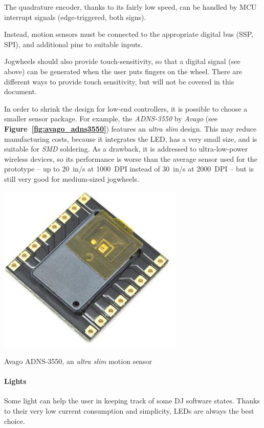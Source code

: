 \documentclass[a4paper,10pt]{article}
\makeatletter
\newenvironment{figurehere}{\def\@captype{figure}\vspace{2ex}}{\vspace{2ex}}
\newcommand{\citef}[1]{\textbf{Figure~\ref{#1}}}
\makeatother
\begin{document}
\begin{multicols}{2}
The quadrature encoder, thanks to its fairly low speed, can be handled by
MCU interrupt signals (edge-triggered, both signs).

Instead, motion sensors must be connected to the appropriate digital bus
(SSP, SPI), and additional pins to suitable inputs.

Jogwheels should also provide touch-sensitivity, so that a digital signal
(see above) can be generated when the user puts fingers on the wheel.
There are different ways to provide touch sensitivity, but will not be
covered in this document.

In order to shrink the design for low-end controllers, it is possible to
choose a smaller sensor package. For example, the \emph{ADNS-3550} by
\emph{Avago} \cite{avago_adns3550} (see \citef{fig:avago_adns3550}) features
an \emph{ultra slim} design. This may reduce manufacturing costs, because it
integrates the LED, has a very small size, and is suitable for \emph{SMD}
soldering. As a drawback, it is addressed to ultra-low-power wireless devices,
so its performance is worse than the average sensor used for the prototype --
up to 20~in/s at 1000~DPI instead of 30~in/s at 2000~DPI -- but is still
very good for medium-sized jogwheels.

\begin{figurehere}
	\centering
	\includegraphics[keepaspectratio=true,width=0.5\columnwidth]{images/avago_adns3550.jpg}
	\caption{Avago ADNS-3550, an \emph{ultra slim} motion sensor}
	\label{fig:avago_adns3550}
\end{figurehere}


\paragraph{Lights}
Some light can help the user in keeping track of some DJ software states.
Thanks to their very low current consumption and simplicity, LEDs are
always the best choice.


\end{multicols}
\end{document}
